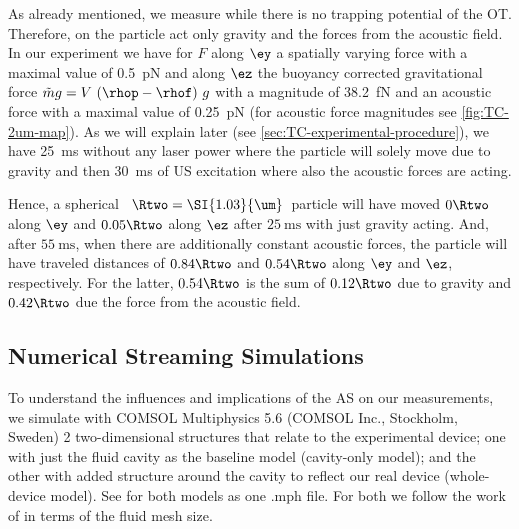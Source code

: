 As already mentioned, we measure while there is no trapping potential of the 
OT. Therefore, on the particle act only gravity and the forces from the 
acoustic field. In our experiment we have for $F$ along $\ey$ a spatially 
varying force with a maximal value of \SI{0.5}{\pico\newton} and along $\ez$ 
the buoyancy corrected gravitational force $\tilde{m}g=V\,\left( \rhop-\rhof 
\right)\,g$ with a magnitude of \SI{38.2}{\femto\newton} and an acoustic force 
with a maximal value of \SI{0.25}{\pico\newton} (for acoustic force magnitudes 
see \cref{fig:TC-2um-map}). As we will explain later (see 
\cref{sec:TC-experimental-procedure}), we have \SI{25}{\ms} without any laser 
power where the particle will solely move due to gravity and then \SI{30}{\ms} 
of US excitation where also the acoustic forces are acting.

Hence, a spherical \SiO~$\Rtwo=\SI{1.03}{\um}$~particle will have moved 
$0\Rtwo$ along $\ey$ and $0.05\Rtwo$ along $\ez$ after $\SI{25}{\ms}$ with just 
gravity acting. And, after $\SI{55}{\ms}$, when there are additionally 
constant acoustic forces, the particle will have traveled distances of 
$0.84\Rtwo$ and $0.54\Rtwo$ along $\ey$ and $\ez$, respectively. For the 
latter, $0.54\Rtwo$ is the sum of $0.12\Rtwo$ due to gravity and $0.42\Rtwo$ 
due the force from the acoustic field.

\subsection{Numerical Streaming Simulations}

To understand the influences and implications of the AS on our measurements, we 
simulate with {\ttfamily COMSOL Multiphysics 5.6} (COMSOL Inc., Stockholm, 
Sweden) 2 two-dimensional structures that relate to the experimental device; 
one with just the fluid cavity as the baseline model (cavity-only model); and 
the other with added structure around the cavity to reflect our real device 
(whole-device model). See \cite{TC_supplemental} for both models as one 
{\ttfamily .mph} file. For both we follow the work of \citeauthor{Muller2015} 
\cite{Muller2015} in terms of the fluid mesh size.

